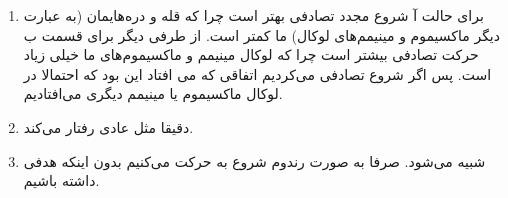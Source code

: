 \begin{enumerate}
    \item برای حالت آ شروع مجدد تصادفی بهتر است چرا که
    قله و دره‌هایمان (به عبارت دیگر ماکسیموم و مینیمم‌های لوکال)
    ما کمتر است. از طرفی دیگر برای قسمت ب حرکت تصادفی بیشتر است چرا که
    لوکال مینیمم و ماکسیموم‌های ما خیلی زیاد است.
    پس اگر شروع تصادفی می‌کردیم اتفاقی که می افتاد این بود که احتمالا
    در لوکال ماکسیموم یا مینیمم دیگری می‌افتادیم.
    \item دقیقا مثل  عادی رفتار می‌کند.
    \item شبیه  می‌شود. صرفا به صورت رندوم شروع به حرکت می‌کنیم بدون اینکه هدفی داشته باشیم.
\end{enumerate}